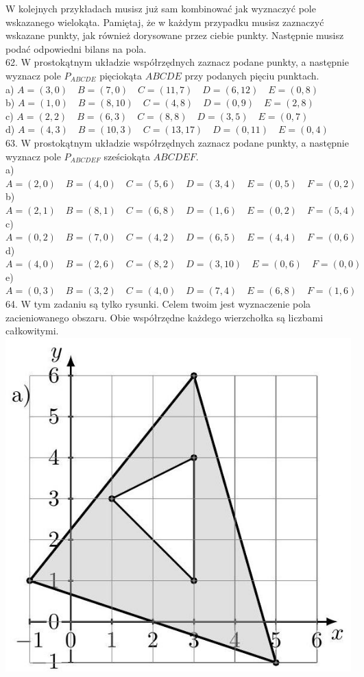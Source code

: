 \documentclass[10pt]{article}
\begin{document}
W kolejnych przykładach musisz już sam kombinować jak wyznaczyć pole wskazanego wielokąta. Pamiętaj, że w każdym przypadku musisz zaznaczyć wskazane punkty, jak również dorysowane przez ciebie punkty. Następnie musisz podać odpowiedni bilans na pola.\\
62. W prostokątnym układzie współrzędnych zaznacz podane punkty, a następnie wyznacz pole \(P_{A B C D E}\) pięciokąta \(A B C D E\) przy podanych pięciu punktach.\\
a) \(A=(3,0) \quad B=(7,0) \quad C=(11,7) \quad D=(6,12) \quad E=(0,8)\)\\
b) \(A=(1,0) \quad B=(8,10) \quad C=(4,8) \quad D=(0,9) \quad E=(2,8)\)\\
c) \(A=(2,2) \quad B=(6,3) \quad C=(8,8) \quad D=(3,5) \quad E=(0,7)\)\\
d) \(A=(4,3) \quad B=(10,3) \quad C=(13,17) \quad D=(0,11) \quad E=(0,4)\)\\
63. W prostokątnym układzie współrzędnych zaznacz podane punkty, a następnie wyznacz pole \(P_{A B C D E F}\) sześciokąta \(A B C D E F\).\\
a) \(A=(2,0) \quad B=(4,0) \quad C=(5,6) \quad D=(3,4) \quad E=(0,5) \quad F=(0,2)\)\\
b) \(A=(2,1) \quad B=(8,1) \quad C=(6,8) \quad D=(1,6) \quad E=(0,2) \quad F=(5,4)\)\\
c) \(A=(0,2) \quad B=(7,0) \quad C=(4,2) \quad D=(6,5) \quad E=(4,4) \quad F=(0,6)\)\\
d) \(A=(4,0) \quad B=(2,6) \quad C=(8,2) \quad D=(3,10) \quad E=(0,6) \quad F=(0,0)\)\\
e) \(A=(0,3) \quad B=(3,2) \quad C=(4,0) \quad D=(7,4) \quad E=(6,8) \quad F=(1,6)\)\\
64. W tym zadaniu są tylko rysunki. Celem twoim jest wyznaczenie pola zacieniowanego obszaru. Obie współrzędne każdego wierzchołka są liczbami całkowitymi.\\
\includegraphics[max width=\textwidth, center]{2024_11_21_8f01584889ff06348ae7g-209(3)}\\
\end{document}

